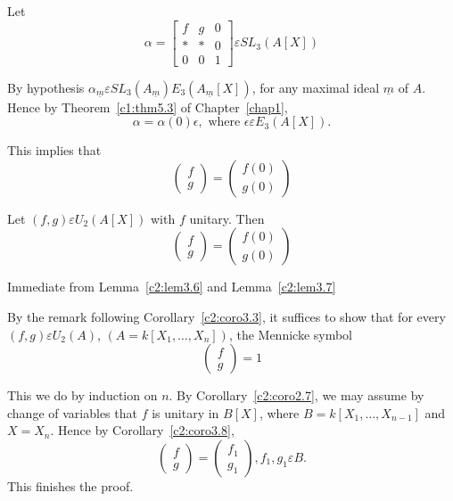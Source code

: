 \begin{Proof}
Let
$$
\alpha=
\begin{bmatrix}
f & g & 0\\
\ast & \ast & 0\\
0 & 0 & 1
\end{bmatrix} \varepsilon SL_3(A[X])
$$

By hypothesis $\alpha_{\underline{m}}\varepsilon
SL_3(A_{\underline{m}})E_3(A_{\underline{m}}[X])$, for any maximal
ideal $\underline{m}$ of $A$. Hence by Theorem~\ref{c1:thm5.3} of
Chapter~\ref{chap1},
$$
\alpha=\alpha(0)\epsilon,\text{ where }\epsilon \varepsilon E_3(A[X]).
$$

This implies that 
$$
\begin{pmatrix}
f\\
g
\end{pmatrix} = \begin{pmatrix}
f(0)\\
g(0)
\end{pmatrix}
$$
\enprf
\end{Proof}

\begin{coro}\label{c2:coro3.8}
Let $(f,g)\varepsilon U_2(A[X])$ with $f$ unitary. Then 
$$
\begin{pmatrix}
f\\
g
\end{pmatrix} = \begin{pmatrix}
f(0)\\
g(0)
\end{pmatrix}
$$
\end{coro}

\begin{Proof}
Immediate from Lemma~\ref{c2:lem3.6} and Lemma~\ref{c2:lem3.7}
\enprf
\end{Proof}

\begin{PRFF}
By the remark following Corollary~\ref{c2:coro3.3}, it suffices to
show that for every $(f,g)\varepsilon U_2(A)$,
$(A=k[X_1,\ldots,X_n])$, the Mennicke symbol
$$
\begin{pmatrix}
f\\
g
\end{pmatrix} =1
$$

This we do by induction on $n$. By Corollary~\ref{c2:coro2.7}, we may
assume by change of variables that $f$ is unitary in $B[X]$, where
$B=k[X_1,\ldots,X_{n-1}]$ and $X=X_n$. Hence by
Corollary~\ref{c2:coro3.8},
$$
\begin{pmatrix}
f\\
g
\end{pmatrix} = \begin{pmatrix}
f_1\\
g_1
\end{pmatrix}, f_1,g_1\varepsilon B.
$$
This finishes the proof.
\enprf
\end{PRFF}
